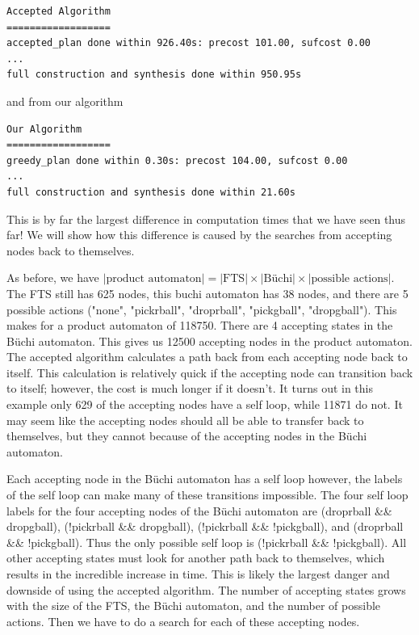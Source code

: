 \begingroup
\fontsize{9pt}{12pt}\selectfont
\begin{lstlisting}
Accepted Algorithm
==================
accepted_plan done within 926.40s: precost 101.00, sufcost 0.00
...
full construction and synthesis done within 950.95s 
\end{lstlisting}
\endgroup
and from our algorithm
\begingroup
\fontsize{9pt}{12pt}\selectfont
\begin{lstlisting}
Our Algorithm
==================
greedy_plan done within 0.30s: precost 104.00, sufcost 0.00
...
full construction and synthesis done within 21.60s
\end{lstlisting} 
\endgroup

This is by far the largest difference in computation times that we have seen thus far! We will show how this difference is caused by the searches from accepting nodes back to themselves.

As before, we have $|\text{product automaton}| =|\text{FTS}| \times |\text{B\"uchi}| \times |\text{possible actions}|$. The FTS still has 625 nodes, this buchi automaton has 38 nodes, and there are 5 possible actions ("none", "pickrball", "droprball", "pickgball", "dropgball"). This makes for a product automaton of 118750. There are 4 accepting states in the B\"uchi automaton. This gives us 12500 accepting nodes in the product automaton. The accepted algorithm calculates a path back from each accepting node back to itself. This calculation is relatively quick if the accepting node can transition back to itself; however, the cost is much longer if it doesn't. It turns out in this example only 629 of the accepting nodes have a self loop, while 11871 do not. It may seem like the accepting nodes should all be able to transfer back to themselves, but they cannot because of the accepting nodes in the B\"uchi automaton. 

Each accepting node in the B\"uchi automaton has a self loop however, the labels of the self loop can make many of these transitions impossible. The four self loop labels for the four accepting nodes of the B\"uchi automaton are (droprball \&\& dropgball), (!pickrball \&\& dropgball), (!pickrball \&\& !pickgball), and (droprball \&\& !pickgball). Thus the only possible self loop is (!pickrball \&\& !pickgball). All other accepting states must look for another path back to themselves, which results in the incredible increase in time. This is likely the largest danger and downside of using the accepted algorithm. The number of accepting states grows with the size of the FTS, the B\"uchi automaton, and the number of possible actions. Then we have to do a search for each of these accepting nodes.  



